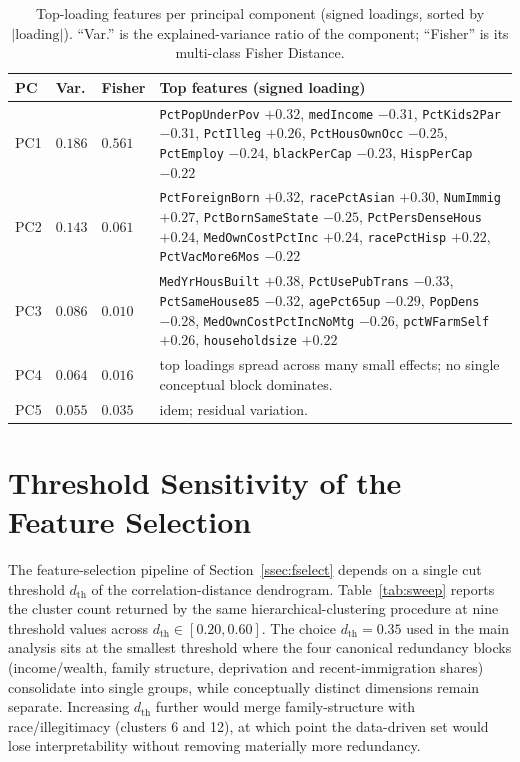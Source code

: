 \documentclass{ieeeaccess}
\begin{document}
\begin{table}[!t]
\caption{Top-loading features per principal component (signed loadings, sorted by $|\text{loading}|$). ``Var.'' is the explained-variance ratio of the component; ``Fisher'' is its multi-class Fisher Distance.}
\label{tab:pcaload}
\centering
\footnotesize
\begin{tabular}{p{0.6cm}p{0.7cm}p{0.7cm}p{5.4cm}}
\toprule
PC & Var. & Fisher & Top features (signed loading) \\
\midrule
PC1 & $0.186$ & $0.561$ & \texttt{PctPopUnderPov} $+0.32$, \texttt{medIncome} $-0.31$, \texttt{PctKids2Par} $-0.31$, \texttt{PctIlleg} $+0.26$, \texttt{PctHousOwnOcc} $-0.25$, \texttt{PctEmploy} $-0.24$, \texttt{blackPerCap} $-0.23$, \texttt{HispPerCap} $-0.22$ \\
\addlinespace
PC2 & $0.143$ & $0.061$ & \texttt{PctForeignBorn} $+0.32$, \texttt{racePctAsian} $+0.30$, \texttt{NumImmig} $+0.27$, \texttt{PctBornSameState} $-0.25$, \texttt{PctPersDenseHous} $+0.24$, \texttt{MedOwnCostPctInc} $+0.24$, \texttt{racePctHisp} $+0.22$, \texttt{PctVacMore6Mos} $-0.22$ \\
\addlinespace
PC3 & $0.086$ & $0.010$ & \texttt{MedYrHousBuilt} $+0.38$, \texttt{PctUsePubTrans} $-0.33$, \texttt{PctSameHouse85} $-0.32$, \texttt{agePct65up} $-0.29$, \texttt{PopDens} $-0.28$, \texttt{MedOwnCostPctIncNoMtg} $-0.26$, \texttt{pctWFarmSelf} $+0.26$, \texttt{householdsize} $+0.22$ \\
\addlinespace
PC4 & $0.064$ & $0.016$ & top loadings spread across many small effects; no single conceptual block dominates. \\
\addlinespace
PC5 & $0.055$ & $0.035$ & idem; residual variation. \\
\bottomrule
\end{tabular}
\end{table}

\section{Threshold Sensitivity of the Feature Selection}
\label{app:sweep}
The feature-selection pipeline of Section~\ref{ssec:fselect} depends on a single cut threshold $d_{\mathrm{th}}$ of the correlation-distance dendrogram. Table~\ref{tab:sweep} reports the cluster count returned by the same hierarchical-clustering procedure at nine threshold values across $d_{\mathrm{th}}\in[0.20, 0.60]$. The choice $d_{\mathrm{th}}=0.35$ used in the main analysis sits at the smallest threshold where the four canonical redundancy blocks (income/wealth, family structure, deprivation and recent-immigration shares) consolidate into single groups, while conceptually distinct dimensions remain separate. Increasing $d_{\mathrm{th}}$ further would merge family-structure with race/illegitimacy (clusters 6 and 12), at which point the data-driven set would lose interpretability without removing materially more redundancy.
\end{document}
